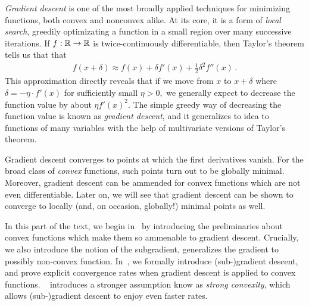 
\emph{Gradient descent} is one of the most broadly applied techniques for minimizing functions, both convex and nonconvex alike. 
%
At its core, it is a form of \emph{local search}, greedily optimizating a function in a small region over many successive iterations. 
%
If $f: \mathbb{R} \to \mathbb{R}$ is twice-continuously differentiable, then Taylor's theorem tells us that that
\begin{align*}
f(x+\delta)\approx f(x) + \delta f'(x) + \frac{1}{2} \delta^2 f''(x)\,.
\end{align*}
This approximation directly reveals that if we move from $x$ to $x+\delta$ where
$\delta=-\eta \cdot f'(x)$ for sufficiently small $\eta>0,$ we generally expect
to decrease the function value by about $\eta f'(x)^2.$ The simple greedy way of
decreasing the function value is known as \emph{gradient descent}, and it generalizes to idea to functions of many variables with the help
of multivariate versions of Taylor's theorem.  

Gradient
descent converges to points at which the first derivatives vanish. For the broad
class of \emph{convex} functions, such points turn out to be globally minimal. 
%
Moreover, gradient descent can be ammended for convex functions which are not even differentiable. 
%
Later on, we will see that gradient descent can be shown to converge to locally (and, on occasion, globally!) minimal points as well.

In this part of the text, we begin in~ by introducing the preliminaries about convex functions which make them so ammenable to gradient descent. 
%
Crucially, we also introduce the notion of the subgradient, generalizes the gradient to possibly non-convex function. 
%
In~, we formally introduce (sub-)gradient descent, and prove explicit convergence rates when gradient descent is applied to convex functions. ~ introduces a stronger assumption know as \emph{strong convexity}, which allows (sub-)gradient descent to enjoy even faster rates. 